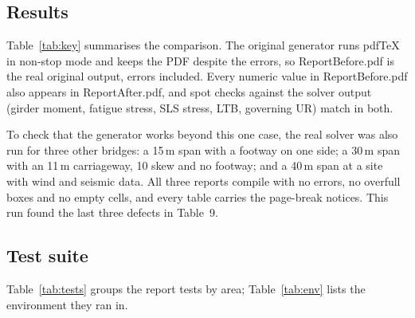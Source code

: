 \documentclass[11pt,a4paper]{article}
\newcommand{\breakus}{\textunderscore\allowbreak}
\newcommand{\file}[1]{{\ttfamily\let\_\breakus #1}}
\begin{document}
\subsection{Results}

Table~\ref{tab:key} summarises the comparison. The original generator runs pdfTeX in non-stop mode and keeps the PDF
despite the errors, so \file{Report\_Before.pdf} is the real original output, errors included. Every numeric value in
\file{Report\_Before.pdf} also appears in \file{Report\_After.pdf}, and spot checks against the solver output (girder
moment, fatigue stress, SLS stress, LTB, governing UR) match in both.

To check that the generator works beyond this one case, the real solver was also run for three other bridges: a 15\,m
span with a footway on one side; a 30\,m span with an 11\,m carriageway, 10\textdegree{} skew and no footway; and a
40\,m span at a site with wind and seismic data. All three reports compile with no errors, no overfull boxes and no
empty cells, and every table carries the page-break notices. This run found the last three defects in Table~9.

\subsection{Test suite}\label{sec:tests}

Table~\ref{tab:tests} groups the report tests by area; Table~\ref{tab:env} lists the environment they ran in.
\end{document}
